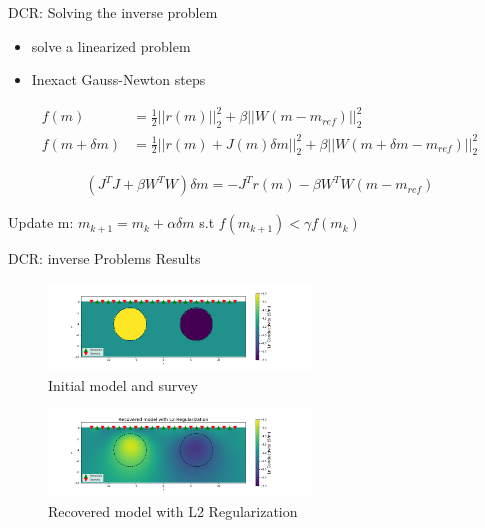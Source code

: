 \documentclass[12pt]{beamer}
\begin{document}
\begin{frame}{DCR: Solving the inverse problem}

\begin{itemize}
  \item solve a linearized problem
  \item Inexact Gauss-Newton steps
\end{itemize}

\begin{align}
f(m) &= \frac{1}{2} ||r(m)||_2^2 + \beta ||W(m-m_{ref})||_2^2 \\
f(m+\delta m) &= \frac{1}{2} ||r(m)+J(m)\delta m||_2^2 + \beta ||W(m+\delta m-m_{ref})||_2^2
\end{align}


\begin{align}
(J^TJ+\beta W^TW)\delta m = -J^Tr(m) - \beta W^TW(m-m_{ref})
\end{align}

Update m: $m_{k+1} = m_k+\alpha \delta m$ s.t $f(m_{k+1}) < \gamma f(m_{k})$

\end{frame}

\begin{frame}{DCR: inverse Problems Results}


\begin{figure}[t!]
    \includegraphics[width=70mm]{figures/initialmodel.png}
    \caption{Initial model and survey}
\end{figure}

  
\begin{figure}[t!]
    \includegraphics[width=70mm]{figures/recoveredModel.png}
    \caption{Recovered model with L2 Regularization}
\end{figure}

\end{frame}
\end{document}
